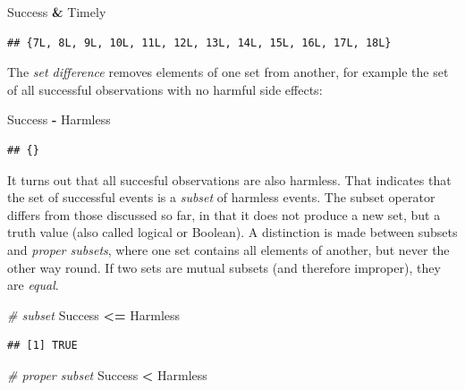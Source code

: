 \documentclass[]{svmono}
\newenvironment{Shaded}{\begin{snugshade}}{\end{snugshade}}
\newcommand{\StringTok}[1]{\textcolor[rgb]{0.31,0.60,0.02}{#1}}
\newcommand{\CommentTok}[1]{\textcolor[rgb]{0.56,0.35,0.01}{\textit{#1}}}
\newcommand{\OperatorTok}[1]{\textcolor[rgb]{0.81,0.36,0.00}{\textbf{#1}}}
\newcommand{\NormalTok}[1]{#1}
\begin{document}
\begin{Shaded}
\begin{Highlighting}[]
\NormalTok{Success }\OperatorTok{&}\StringTok{ }\NormalTok{Timely}
\end{Highlighting}
\end{Shaded}

\begin{verbatim}
## {7L, 8L, 9L, 10L, 11L, 12L, 13L, 14L, 15L, 16L, 17L, 18L}
\end{verbatim}

The \emph{set difference} removes elements of one set from another, for
example the set of all successful observations with no harmful side
effects:

\begin{Shaded}
\begin{Highlighting}[]
\NormalTok{Success }\OperatorTok{-}\StringTok{ }\NormalTok{Harmless}
\end{Highlighting}
\end{Shaded}

\begin{verbatim}
## {}
\end{verbatim}

It turns out that all succesful observations are also harmless. That
indicates that the set of successful events is a \emph{subset} of
harmless events. The subset operator differs from those discussed so
far, in that it does not produce a new set, but a truth value (also
called logical or Boolean). A distinction is made between subsets and
\emph{proper subsets}, where one set contains all elements of another,
but never the other way round. If two sets are mutual subsets (and
therefore improper), they are \emph{equal}.

\begin{Shaded}
\begin{Highlighting}[]
\CommentTok{# subset}
\NormalTok{Success }\OperatorTok{<=}\StringTok{ }\NormalTok{Harmless}
\end{Highlighting}
\end{Shaded}

\begin{verbatim}
## [1] TRUE
\end{verbatim}

\begin{Shaded}
\begin{Highlighting}[]
\CommentTok{# proper subset}
\NormalTok{Success }\OperatorTok{<}\StringTok{ }\NormalTok{Harmless}
\end{Highlighting}
\end{Shaded}
\end{document}
